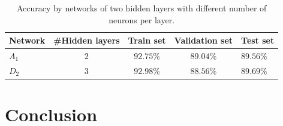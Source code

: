 \documentclass[12pt]{article}
\begin{document}
\begin{table}
\begin{center}
\begin{tabular}{|l||c|c|c|l|}
\hline
Network & \#Hidden layers & Train set & Validation set & Test set\\ \hline \hline
$A_1$ & $2$ & $92.75\%$ & $89.04\%$ & $89.56\%$\\ \hline
$D_2$ & $3$ & $92.98\%$ & $88.56\%$ & $89.69\%$\\ \hline
\end{tabular}
\caption{Accuracy by networks of two hidden layers with different number of neurons per layer.}
\label{tab:stack_50_50_50}
\end{center}
\end{table}


\section{Conclusion}
\noindent



\end{document}
